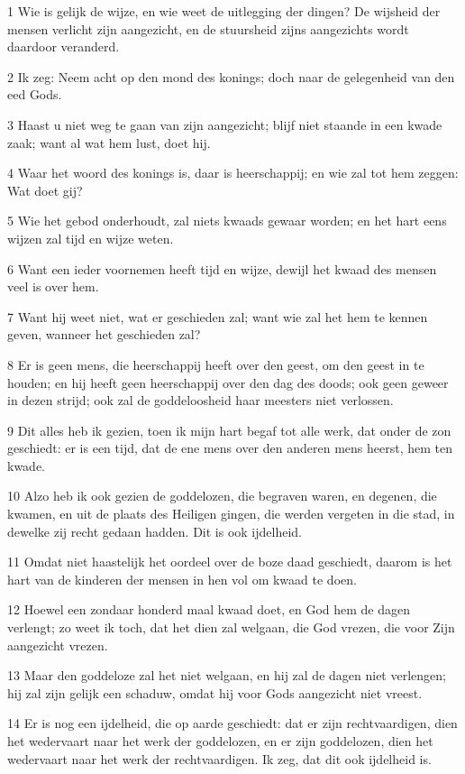 \par 1 Wie is gelijk de wijze, en wie weet de uitlegging der dingen? De wijsheid der mensen verlicht zijn aangezicht, en de stuursheid zijns aangezichts wordt daardoor veranderd.
\par 2 Ik zeg: Neem acht op den mond des konings; doch naar de gelegenheid van den eed Gods.
\par 3 Haast u niet weg te gaan van zijn aangezicht; blijf niet staande in een kwade zaak; want al wat hem lust, doet hij.
\par 4 Waar het woord des konings is, daar is heerschappij; en wie zal tot hem zeggen: Wat doet gij?
\par 5 Wie het gebod onderhoudt, zal niets kwaads gewaar worden; en het hart eens wijzen zal tijd en wijze weten.
\par 6 Want een ieder voornemen heeft tijd en wijze, dewijl het kwaad des mensen veel is over hem.
\par 7 Want hij weet niet, wat er geschieden zal; want wie zal het hem te kennen geven, wanneer het geschieden zal?
\par 8 Er is geen mens, die heerschappij heeft over den geest, om den geest in te houden; en hij heeft geen heerschappij over den dag des doods; ook geen geweer in dezen strijd; ook zal de goddeloosheid haar meesters niet verlossen.
\par 9 Dit alles heb ik gezien, toen ik mijn hart begaf tot alle werk, dat onder de zon geschiedt: er is een tijd, dat de ene mens over den anderen mens heerst, hem ten kwade.
\par 10 Alzo heb ik ook gezien de goddelozen, die begraven waren, en degenen, die kwamen, en uit de plaats des Heiligen gingen, die werden vergeten in die stad, in dewelke zij recht gedaan hadden. Dit is ook ijdelheid.
\par 11 Omdat niet haastelijk het oordeel over de boze daad geschiedt, daarom is het hart van de kinderen der mensen in hen vol om kwaad te doen.
\par 12 Hoewel een zondaar honderd maal kwaad doet, en God hem de dagen verlengt; zo weet ik toch, dat het dien zal welgaan, die God vrezen, die voor Zijn aangezicht vrezen.
\par 13 Maar den goddeloze zal het niet welgaan, en hij zal de dagen niet verlengen; hij zal zijn gelijk een schaduw, omdat hij voor Gods aangezicht niet vreest.
\par 14 Er is nog een ijdelheid, die op aarde geschiedt: dat er zijn rechtvaardigen, dien het wedervaart naar het werk der goddelozen, en er zijn goddelozen, dien het wedervaart naar het werk der rechtvaardigen. Ik zeg, dat dit ook ijdelheid is.

